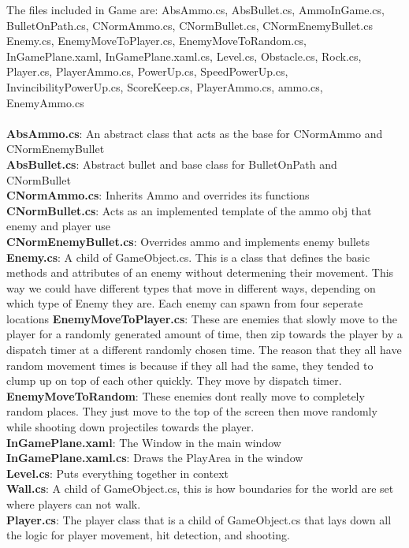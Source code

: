 \documentclass[10pt,conference,onecolumn,compsoc]{IEEEtran}
\begin{document}
The files included in Game are: AbsAmmo.cs, AbsBullet.cs, AmmoInGame.cs, BulletOnPath.cs, CNormAmmo.cs, CNormBullet.cs, CNormEnemyBullet.cs
Enemy.cs, EnemyMoveToPlayer.cs, EnemyMoveToRandom.cs, InGamePlane.xaml, InGamePlane.xaml.cs, Level.cs, Obstacle.cs, Rock.cs,
Player.cs, PlayerAmmo.cs, PowerUp.cs, SpeedPowerUp.cs, InvincibilityPowerUp.cs, ScoreKeep.cs, PlayerAmmo.cs, ammo.cs, EnemyAmmo.cs\\\\

\textbf{AbsAmmo.cs}: An abstract class that acts as the base for CNormAmmo and CNormEnemyBullet \\
\textbf{AbsBullet.cs}: Abstract bullet and base class for BulletOnPath  and CNormBullet \\
\textbf{CNormAmmo.cs}: Inherits Ammo and overrides its functions 
\textbf{CNormBullet.cs}: Acts as an implemented template of the ammo obj that enemy and player use  \\
\textbf{CNormEnemyBullet.cs}: Overrides ammo and implements enemy bullets
\textbf{Enemy.cs}: A child of GameObject.cs. This is a class that defines the basic methods and attributes of an enemy without determening their movement. 
This way we could have different types that move in different ways, depending on which type of Enemy they are. Each enemy can spawn from four seperate locations
\textbf{EnemyMoveToPlayer.cs}: These are enemies that slowly move to the player for a randomly generated amount of time, then zip towards the player
by a dispatch timer at a different randomly chosen time. The reason that they all have random movement times is because if they all had the same, they tended to clump up on top of each other quickly. They move by dispatch timer.\\
\textbf{EnemyMoveToRandom}: These enemies dont really move to completely random places. They just move to the top of the screen then move randomly
while shooting down projectiles towards the player.\\
\textbf{InGamePlane.xaml}: The Window in the main window \\
\textbf{InGamePlane.xaml.cs}: Draws the PlayArea in the window \\
\textbf{Level.cs}: Puts everything together in context \\
\textbf{Wall.cs}: A child of GameObject.cs, this is how boundaries for the world are set where players can not walk.\\
\textbf{Player.cs}: The player class that is a child of GameObject.cs that lays down all the logic for player movement, hit detection, and shooting.
\end{document}
